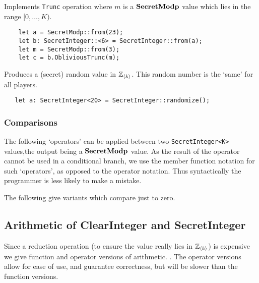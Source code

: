 Implements \verb|Trunc| operation where $m$ is a $\mathbf{SecretModp}$ value
which lies in the range $[0,\ldots,K)$.
\begin{lstlisting}
    let a = SecretModp::from(23);
    let b: SecretInteger::<6> = SecretInteger::from(a);
    let m = SecretModp::from(3);
    let c = b.ObliviousTrunc(m);
\end{lstlisting}


Produces a (secret) random value in ${\mathbb{Z}}_{\langle k \rangle}$.
This random number is the `same' for all players.
\begin{lstlisting}
   let a: SecretInteger<20> = SecretInteger::randomize();
\end{lstlisting}

\subsubsection{Comparisons}
The following `operators' can be applied between two \verb|SecretInteger<K>| 
values,the output being a $\mathbf{SecretModp}$ value.
As the result of the operator cannot be used in a conditional branch,
we use the member function notation for such `operators', as opposed
to the operator notation. Thus syntactically the programmer is less
likely to make a mistake.

\noindent
The following give variants which compare just to zero.

\subsection{Arithmetic of ClearInteger and SecretInteger}
Since a reduction operation (to ensure the value really lies in
${\mathbb{Z}}_{\langle k \rangle}$) is expensive we give function and operator versions of arithmetic.
.
The operator versions allow for ease of use, and guarantee correctness,
but will be slower than the function versions.

